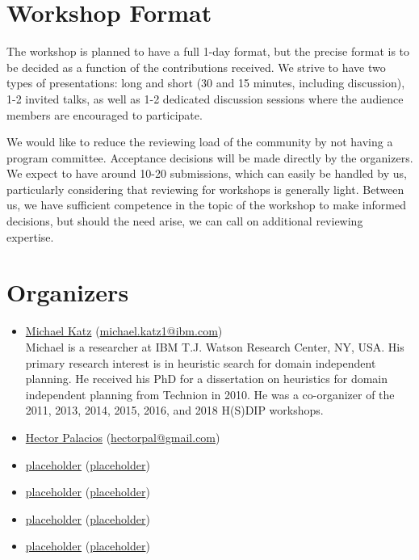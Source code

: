 \documentclass[10pt]{article}
\begin{document}
\section*{Workshop Format}

The workshop is planned to have a full 1-day format, but the precise format is
to be decided as a function of the contributions received. We strive to have two
types of presentations: long and short (30 and 15 minutes, including
discussion), 1-2 invited talks, as well as 1-2 dedicated discussion sessions
where the audience members are encouraged to participate.

We would like to reduce the reviewing load of the community by not having a
program committee. Acceptance decisions will be made directly by the organizers.
We expect to have around 10-20 submissions, which can easily be handled by us,
particularly considering that reviewing for workshops is generally light.
Between us, we have sufficient competence in the topic of the workshop to make
informed decisions, but should the need arise, we can call on additional
reviewing expertise.

\section*{Organizers}

\begin{itemize}



\item \href{https://resedit.watson.ibm.com/researcher/view.php?person=ibm-Michael.Katz1}{Michael Katz}
 (\href{mailto:michael.katz1@ibm.com}{michael.katz1@ibm.com})\\
 Michael is a researcher at IBM T.J. Watson Research Center, NY, USA. His
 primary research interest is in heuristic search for domain independent planning.
 He received his PhD for a dissertation on heuristics for domain independent
 planning from Technion in 2010.
 He was a co-organizer of the 2011, 2013, 2014, 2015, 2016, and 2018 H(S)DIP
 workshops.


\item \href{http://hectorpalacios.net/}{Hector Palacios}
  (\href{mailto:hectorpal@gmail.com}{hectorpal@gmail.com})\\

\item \href{placeholder}{placeholder}
  (\href{mailto:placeholder}{placeholder})\\

\item \href{placeholder}{placeholder}
  (\href{mailto:placeholder}{placeholder})\\

\item \href{placeholder}{placeholder}
  (\href{mailto:placeholder}{placeholder})\\

\item \href{placeholder}{placeholder}
  (\href{mailto:placeholder}{placeholder})\\

  
\end{itemize}
\end{document}
